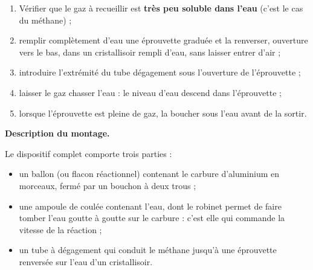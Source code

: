 \documentclass[11pt]{article}
\newcommand{\cle}[1]{{\popxbold\color{popdark}#1}}
\begin{document}
\begin{methode}
\begin{enumerate}
\item Vérifier que le gaz à recueillir est \textbf{très peu soluble dans l'eau} (c'est le cas du méthane) ;
\item remplir complètement d'eau une éprouvette graduée et la renverser, ouverture vers le bas, dans un cristallisoir rempli d'eau, sans laisser entrer d'air ;
\item introduire l'extrémité du tube dégagement sous l'ouverture de l'éprouvette ;
\item laisser le gaz chasser l'eau : le niveau d'eau descend dans l'éprouvette ;
\item lorsque l'éprouvette est pleine de gaz, la boucher sous l'eau avant de la sortir.
\end{enumerate}
\end{methode}

\textbf{Description du montage.}\par
Le dispositif complet comporte trois parties :
\begin{itemize}
\item un \cle{ballon} (ou flacon réactionnel) contenant le carbure d'aluminium en morceaux, fermé par un bouchon à deux trous ;
\item une \cle{ampoule de coulée} contenant l'eau, dont le robinet permet de faire tomber l'eau goutte à goutte sur le carbure : c'est elle qui commande la vitesse de la réaction ;
\item un \cle{tube à dégagement} qui conduit le méthane jusqu'à une éprouvette renversée sur l'eau d'un cristallisoir.
\end{itemize}
\end{document}
